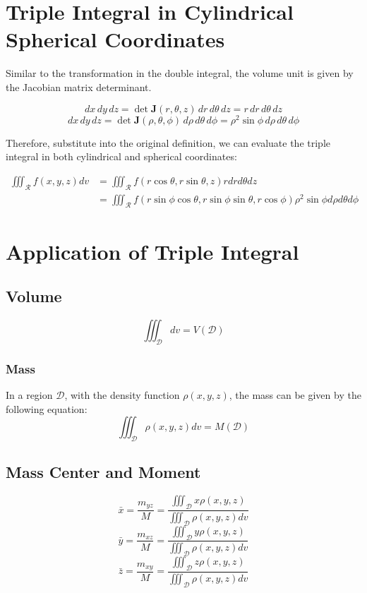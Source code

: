 \documentclass[UTF8,a4paper, 10pt, openany]{svmono}
\begin{document}
\section{Triple Integral in Cylindrical Spherical Coordinates}
Similar to the transformation in the double integral, the volume unit is given by the Jacobian matrix determinant.

\[dx\,dy\,dz=\det \mathbf{J}(r,\theta,z)\,dr\,d\theta \,dz=r\,dr\,d\theta \,dz\]
\[dx\,dy\,dz=\det \mathbf{J}(\rho,\theta,\phi)\,d\rho \,d\theta \,d\phi=\rho ^2\sin \phi \,d\rho \,d\theta \,d\phi\]

Therefore, substitute into the original definition, we can evaluate the triple integral in both cylindrical and spherical coordinates:

\begin{align*}
\iiint_{\mathcal{R}}f(x,y,z)dv &=\iiint_{\mathcal{R}}f(r\cos \theta,r\sin \theta,z)rdrd\theta dz \\
&= \iiint_{\mathcal{R}}f(r\sin \phi \cos \theta,r\sin \phi \sin \theta,r\cos \phi)\rho ^2\sin \phi d\rho d\theta d\phi
\end{align*}

\section{Application of Triple Integral}
\subsection{Volume}
$$\iiint_{\mathcal{D}}dv=V(\mathcal{D})$$
\subsubsection{Mass}
In a region $\mathcal{D}$, with the density function $\rho (x,y,z)$, the mass can be given by the following equation:
$$\iiint_{\mathcal{D}}\rho (x,y,z)dv=M(\mathcal{D})$$

\subsection{Mass Center and Moment}
$$\bar{x}=\dfrac{m_{yz}}{M}=\dfrac{\displaystyle\iiint_{\mathcal{D}}x\rho(x,y,z)}{\displaystyle\iiint_{\mathcal{D}}\rho (x,y,z)dv}$$
$$\bar{y}=\dfrac{m_{xz}}{M}=\dfrac{\displaystyle\iiint_{\mathcal{D}}y\rho(x,y,z)}{\displaystyle\iiint_{\mathcal{D}}\rho (x,y,z)dv}$$
$$\bar{z}=\dfrac{m_{xy}}{M}=\dfrac{\displaystyle\iiint_{\mathcal{D}}z\rho(x,y,z)}{\displaystyle\iiint_{\mathcal{D}}\rho (x,y,z)dv}$$
\end{document}
